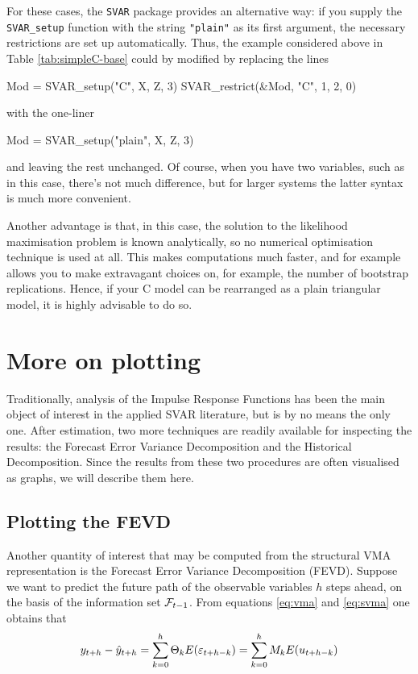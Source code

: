 \documentclass[a4paper,10pt]{article}
\newcommand{\PrE}[1]{\ensuremath \varepsilon_{#1}}
\newcommand{\StS}[1]{\ensuremath u_{#1}}
\newcommand{\InfSet}[1]{\ensuremath \mathcal{F}_{#1}}
\begin{document}
For these cases, the \texttt{SVAR} package provides an alternative
way: if you supply the \texttt{SVAR\_setup} function with the string
\texttt{"plain"} as its first argument, the necessary restrictions are
set up automatically. Thus, the example considered above in Table
\ref{tab:simpleC-base} could by modified by replacing the lines
\begin{code}
Mod = SVAR_setup("C", X, Z, 3)
SVAR_restrict(&Mod, "C", 1, 2, 0)
\end{code}
with the one-liner
\begin{code}
Mod = SVAR_setup("plain", X, Z, 3)
\end{code}
and leaving the rest unchanged. Of course, when you have two
variables, such as in this case, there's not much difference, but for
larger systems the latter syntax is much more convenient.

Another advantage is that, in this case, the solution to the
likelihood maximisation problem is known analytically, so no numerical
optimisation technique is used at all. This makes computations much
faster, and for example allows you to make extravagant choices on, for
example, the number of bootstrap replications. Hence, if your C model
can be rearranged as a plain triangular model, it is highly advisable
to do so.

\section{More on plotting}
\label{sec:moreplots}

Traditionally, analysis of the Impulse Response Functions has been the
main object of interest in the applied SVAR literature, but is by no
means the only one.  After estimation, two more techniques are readily
available for inspecting the results: the Forecast Error Variance
Decomposition and the Historical Decomposition. Since the results from
these two procedures are often visualised as graphs, we will describe
them here.

\subsection{Plotting the FEVD}
\label{sec:fevdplots}

Another quantity of interest that may be computed from the structural
VMA representation is the Forecast Error Variance Decomposition
(FEVD).  Suppose we want to predict the future path of the observable
variables $h$ steps ahead, on the basis of the information set
$\InfSet{t-1}$. From equations \eqref{eq:vma} and \eqref{eq:svma} one
obtains that
\[
y_{t+h} - \hat{y}_{t+h} = \sum_{k=0}^h \Theta_k E(\PrE{t+h-k}) =
\sum_{k=0}^h M_k E(\StS{t+h-k})
\]
\end{document}
